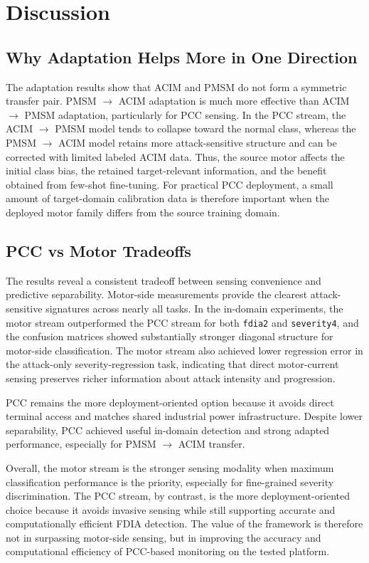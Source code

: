 \documentclass[lettersize,journal]{IEEEtran}
\begin{document}
\section{Discussion}
\label{sec:discussion}
\subsection{Why Adaptation Helps More in One Direction}
\label{sec:adaptation_asymmetry}
The adaptation results show that ACIM and PMSM do not form a symmetric transfer pair. PMSM $\rightarrow$ ACIM adaptation is much more effective than ACIM $\rightarrow$ PMSM adaptation, particularly for PCC sensing. In the PCC stream, the ACIM $\rightarrow$ PMSM model tends to collapse toward the normal class, whereas the PMSM $\rightarrow$ ACIM model retains more attack-sensitive structure and can be corrected with limited labeled ACIM data. Thus, the source motor affects the initial class bias, the retained target-relevant information, and the benefit obtained from few-shot fine-tuning. For practical PCC deployment, a small amount of target-domain calibration data is therefore important when the deployed motor family differs from the source training domain.

\subsection{PCC vs Motor Tradeoffs}
\label{sec:pcc_vs_motor}

The results reveal a consistent tradeoff between sensing convenience and predictive separability. Motor-side measurements provide the clearest attack-sensitive signatures across nearly all tasks. In the in-domain experiments, the motor stream outperformed the PCC stream for both \texttt{fdia2} and \texttt{severity4}, and the confusion matrices showed substantially stronger diagonal structure for motor-side classification. The motor stream also achieved lower regression error in the attack-only severity-regression task, indicating that direct motor-current sensing preserves richer information about attack intensity and progression.

PCC remains the more deployment-oriented option because it avoids direct terminal access and matches shared industrial power infrastructure. Despite lower separability, PCC achieved useful in-domain detection and strong adapted performance, especially for PMSM $\rightarrow$ ACIM transfer.

Overall, the motor stream is the stronger sensing modality when maximum classification performance is the priority, especially for fine-grained severity discrimination. The PCC stream, by contrast, is the more deployment-oriented choice because it avoids invasive sensing while still supporting accurate and computationally efficient FDIA detection. The value of the framework is therefore not in surpassing motor-side sensing, but in improving the accuracy and computational efficiency of PCC-based monitoring on the tested platform.
\end{document}
